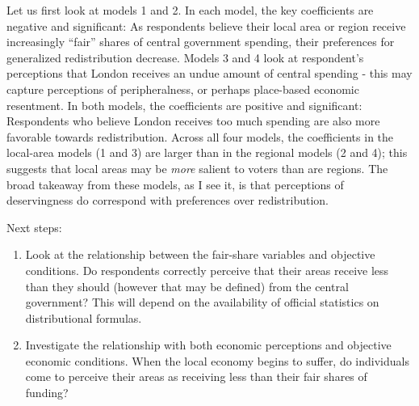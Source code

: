 \documentclass[
]{article}
\begin{document}
Let us first look at models 1 and 2. In each model, the key coefficients
are negative and significant: As respondents believe their local area or
region receive increasingly ``fair'' shares of central government
spending, their preferences for generalized redistribution decrease.
Models 3 and 4 look at respondent's perceptions that London receives an
undue amount of central spending - this may capture perceptions of
peripheralness, or perhaps place-based economic resentment. In both
models, the coefficients are positive and significant: Respondents who
believe London receives too much spending are also more favorable
towards redistribution. Across all four models, the coefficients in the
local-area models (1 and 3) are larger than in the regional models (2
and 4); this suggests that local areas may be \textit{more} salient to
voters than are regions. The broad takeaway from these models, as I see
it, is that perceptions of deservingness do correspond with preferences
over redistribution.

Next steps:

\begin{enumerate}
\item Look at the relationship between the fair-share variables and objective conditions. Do respondents correctly perceive that their areas receive less than they should (however that may be defined) from the central government? This will depend on the availability of official statistics on distributional formulas. 

\item Investigate the relationship with both economic perceptions and objective economic conditions. When the local economy begins to suffer, do individuals come to perceive their areas as receiving less than their fair shares of funding? 


\end{enumerate}
\end{document}
